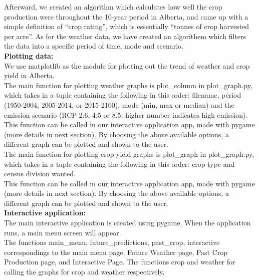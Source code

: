 \documentclass[fontsize=11pt]{article}
\begin{document}
Afterward, we created an algorithm which calculates how well the crop production were throughout the 10-year period in Alberta, and came up with a simple definition of “crop rating”, which is essentially “tonnes of crop harvested per acre”. As for the weather data, we have created an algorithem which filters the data into a specific period of time, mode and scenario. \\

\textbf{Plotting data:}\\

We use matplotlib as the module for plotting out the trend of weather and crop yield in Alberta.\\

The main function for plotting weather graphs is plot\_column in plot\_graph.py, which takes in a tuple containing the following in this order: filename, period (1950-2004, 2005-2014, or 2015-2100), mode (min, max or median) and the emission scenario (RCP 2.6, 4.5 or 8.5; higher number indicates high emission). \\

This function can be called in our interactive application app, made with pygame (more details in next section). By choosing the above available options, a different graph can be plotted and shown to the user.\\

The main function for plotting crop yield graphs is plot\_graph in plot\_graph.py, which takes in a tuple containing the following in this order: crop type and census division wanted. \\

This function can be called in our interactive application app, made with pygame (more details in next section). By choosing the above available options, a different graph can be plotted and shown to the user.\\

\textbf{Interactive application:}\\

The main interactive application is created using pygame. When the application runs, a main menu screen will appear. \\

The functions main\_menu, future\_predictions, past\_crop, interactive correspondings to the main menu page, Future Weather page, Past Crop Production page, and Interactive Page. The functions crop and weather for calling the graphs for crop and weather respectively.\\
\end{document}
